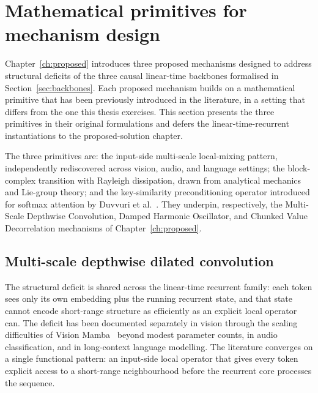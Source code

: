 \section{Mathematical primitives for mechanism design}\label{sec:primitives}

Chapter~\ref{ch:proposed} introduces three proposed mechanisms designed
to address structural deficits of the three causal linear-time backbones
formalised in Section~\ref{sec:backbones}. Each proposed mechanism
builds on a mathematical primitive that has been previously introduced
in the literature, in a setting that differs from the one this thesis
exercises. This section presents the three primitives in their original
formulations and defers the linear-time-recurrent instantiations to the
proposed-solution chapter.

The three primitives are: the input-side multi-scale local-mixing
pattern, independently rediscovered across vision, audio, and language
settings; the block-complex transition with Rayleigh dissipation,
drawn from analytical mechanics and Lie-group theory; and the
key-similarity preconditioning operator introduced for softmax
attention by Duvvuri et al.~\cite{duvvuri2026lucid}. They underpin, respectively, the
Multi-Scale Depthwise Convolution, Damped Harmonic Oscillator, and
Chunked Value Decorrelation mechanisms of Chapter~\ref{ch:proposed}.

\subsection{Multi-scale depthwise dilated convolution}\label{sec:primitives:msdc}

The structural deficit is shared across the linear-time recurrent
family: each token sees only its own embedding plus the running
recurrent state, and that state cannot encode short-range structure as
efficiently as an explicit local operator can. The deficit has been
documented separately in vision through the scaling difficulties of
Vision Mamba~\cite{zhu2024visionmamba} beyond modest parameter counts,
in audio classification, and in long-context language modelling. The
literature converges on a single functional pattern: an input-side
local operator that gives every token explicit access to a short-range
neighbourhood before the recurrent core processes the sequence.

